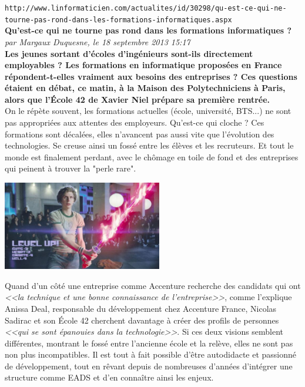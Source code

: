 \documentclass[11pt,twoside,a4paper]{article}
\begin{document}
\setlength\parindent{0pt}

\texttt{http://www.linformaticien.com/actualites/id/30298/qu-est-ce-qui-ne-tourne-pas-rond-dans-les-formations-informatiques.aspx}~\\

\textbf{\LARGE Qu'est-ce qui ne tourne pas rond dans les formations informatiques ?} ~\\

\emph{\small par Margaux Duquesne, le 18 septembre 2013 15:17} ~\\

\textbf{Les jeunes sortant d'{\'e}coles d'ing{\'e}nieurs sont-ils directement employables ? Les formations en informatique propos{\'e}es en France r{\'e}pondent-t-elles vraiment aux besoins des entreprises ? Ces questions {\'e}taient en d{\'e}bat, ce matin, {\`a} la Maison des Polytechniciens {\`a} Paris, alors que l'{\'E}cole 42 de Xavier Niel pr{\'e}pare sa premi{\`e}re rentr{\'e}e. } ~\\

On le r{\'e}p{\`e}te souvent, les formations actuelles ({\'e}cole, universit{\'e}, BTS...) ne sont pas appropri{\'e}es aux attentes des employeurs. Qu'est-ce qui cloche ? Ces formations sont d{\'e}cal{\'e}es, elles n'avancent pas aussi vite que l'{\'e}volution des technologies. Se creuse ainsi un foss{\'e} entre les {\'e}l{\`e}ves et les recruteurs. Et tout le monde est finalement perdant, avec le ch{\^o}mage en toile de fond et des entreprises qui peinent {\`a} trouver la "perle rare". ~\\

\begin{minipage}[ht]{7.00cm}
	\includegraphics[width=6.95cm]{img/59580392.jpg}
\end{minipage} \hfill \begin{minipage}[ht]{0.65\textwidth}
	Quand d'un c{\^o}t{\'e} une entreprise comme Accenture recherche des candidats qui ont \emph{<<la technique et une bonne connaissance de l'entreprise>>}, comme l'explique Anissa Deal, responsable du d{\'e}veloppement chez Accenture France, Nicolas Sadirac et son {\'E}cole 42 cherchent davantage {\`a} cr{\'e}er des profils de personnes \emph{<<qui se sont {\'e}panouies dans la technologie>>}.  Si ces deux visions semblent diff{\'e}rentes, montrant le foss{\'e} entre l'ancienne {\'e}cole et la rel{\`e}ve, elles ne sont pas non plus incompatibles. Il est tout {\`a} fait possible d'{\^e}tre autodidacte et passionn{\'e} de d{\'e}veloppement, tout en r{\^e}vant depuis de nombreuses d'ann{\'e}es d'int{\'e}grer une structure comme EADS et d'en conna{\^i}tre ainsi les enjeux. %
\end{minipage}~\\~\\
\end{document}
